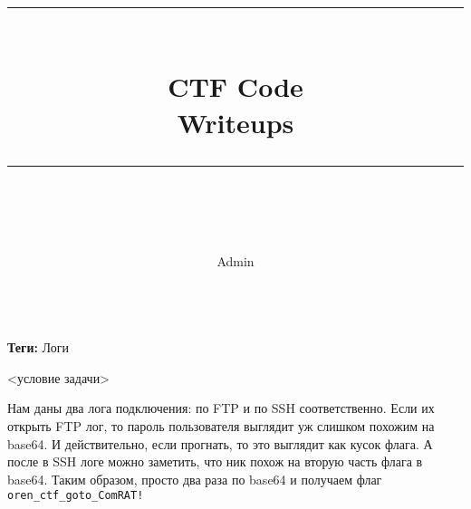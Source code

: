 \documentclass[idxtotoc,hyperref,openany,oneside]{files/admin} %
\newcommand{\HRule}{\rule{\linewidth}{0.5mm}} %
\begin{document}

\frontmatter %
\title{
\begin{center}
\HRule \\[0.4cm]
{\Huge \bfseries CTF Code \\[0.5cm] \Large Writeups}\\[0.4cm] %
\HRule \\[1.5cm]
\end{center}
}
\author{\Huge Admin \\ \\[2cm]} %
\maketitle

\tableofcontents

\mainmatter %












\textbf{Теги:} Логи \vspace{\baselineskip}

\begin{tcolorbox}
<условие задачи>
\end{tcolorbox}

Нам даны два лога подключения: по FTP и по SSH соответственно. Если их открыть FTP лог, то пароль пользователя выглядит уж слишком похожим на base64. И действительно, если прогнать, то это выглядит как кусок флага. А после в SSH логе можно заметить, что ник похож на вторую часть флага в base64. Таким образом, просто два раза по base64 и получаем флаг \verb|oren_ctf_goto_ComRAT!|
\end{document}
